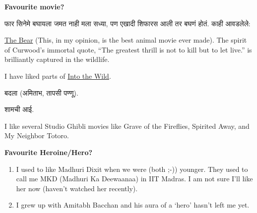 \documentclass[17pt]{extarticle}  %
\begin{document}
\begin{enumerate}
\begin{english}
\item
\textbf{Favourite movie?}\\
\begin{marathi}
फार सिनेमे बघायला जमत नाही मला सध्या, पण एखादी शिफारस आली तर बघणं होतं. काही आवडलेले:
\end{marathi}
\begin{enumerate}
\item 
\begin{english}
\href{https://en.wikipedia.org/wiki/The_Bear_(1988_film)}{The Bear} (This, in my opinion, is the best animal movie ever made). The spirit of Curwood's immortal quote, \enquote{The greatest thrill is not to kill but to let live.} is brilliantly captured in the wildlife.
\item I have liked parts of \href{https://en.wikipedia.org/wiki/Into_the_Wild_(film)}{Into the Wild}.
\end{english}

\item \begin{marathi} बदला (अमिताभ, तापसी पण्णू).\end{marathi}
\item \begin{marathi} शामची आई.\end{marathi}

\item I like several Studio Ghibli movies like Grave of the Fireflies, Spirited Away, and My Neighbor Totoro.
\end{enumerate}

\item 
\textbf{Favourite Heroine/Hero?}\\
\begin{enumerate}
\item I used to like Madhuri Dixit when we were (both ;-)) younger. They used to call me MKD (Madhuri Ka Deewaanaa) in IIT Madras. I am not sure I'll like her now (haven't watched her recently).
\item I grew up with Amitabh Bacchan and his aura of a \enquote*{hero} hasn't left me yet.
\end{enumerate}


\end{english}
\end{enumerate}
\end{document}
